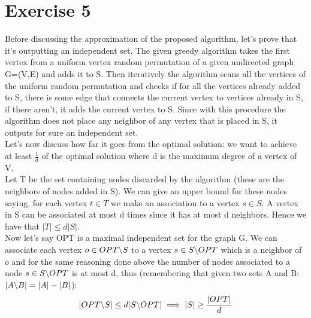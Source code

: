 \documentclass[11pt]{article}
\theoremstyle{definition}
\begin{document}
\section{Exercise 5}
Before discussing the approximation of the proposed algorithm, let's prove that it's outputting an independent set. The given greedy algorithm takes the first vertex from a uniform vertex random permutation of a given undirected graph G=(V,E) and adds it to S. Then iteratively the algorithm scans all the vertices of the uniform random permutation and checks if for all the vertices already added to S, there is some edge that connects the current vertex to vertices already in S, if there aren't, it adds the current vertex to S. Since with this procedure the algorithm does not place any neighbor of any vertex that is placed in S, it outputs for sure an independent set.\\
Let's now discuss how far it goes from the optimal solution: we want to achieve at least $\frac{1}{d}$ of the optimal solution where d is the maximum degree of a vertex of V.\\
Let T be the set containing nodes discarded by the algorithm (these are the neighbors of nodes added in S). We can give an upper bound for these nodes saying, for each vertex $t \in T$ we make an association to a vertex $s \in S$. A vertex in S can be associated at most d times since it has at most d neighbors. Hence we have that $|T| \leq d|S|$.\\
Now let's say OPT is a maximal independent set for the graph G. We can associate each vertex $o \in OPT\symbol{92} S $ to a vertex $s \in S\symbol{92}OPT$ which is a neighbor of $o$ and for the same reasoning done above the number of nodes associated to a node $s \in S\symbol{92}OPT$  is at most d, thus (remembering that given two sets A and B: $|A\symbol{92}B|=|A|-|B|$):
\begin{equation}
|OPT\symbol{92}S| \leq d|S\symbol{92}OPT| \implies |S| \geq \frac{|OPT|}{d}
\end{equation}
\end{document}
